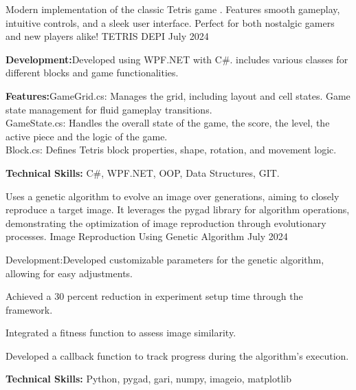 \begin{cventries}
  \cventry
    {Modern implementation of the classic Tetris game . Features smooth gameplay, intuitive controls, and a sleek user interface. Perfect for both nostalgic gamers and new players alike!
} %
    {TETRIS} %
    {DEPI} %
    {July 2024} %
    {
      \begin{cvitems} %
        \item \textbf{Development:}{Developed using WPF.NET with C#. includes various classes for different blocks and game functionalities.}
        \item \textbf{Features:}{GameGrid.cs: Manages the grid, including layout and cell states. Game state management for fluid gameplay transitions.\\ GameState.cs: Handles the overall state of the game, the score, the level, the active piece and the logic of the game.\\
        Block.cs: Defines Tetris block properties, shape, rotation, and movement logic.}
        \item \textbf{Technical Skills:}{ C\#, WPF.NET, OOP, Data Structures, GIT.}
      \end{cvitems}
    }
\end{cventries}  


\begin{cventries}
  \cventry
    {Uses a genetic algorithm to evolve an image over generations, aiming to closely reproduce a target image. It leverages the pygad library for algorithm operations, demonstrating the optimization of image reproduction through evolutionary processes.
} %
    {Image Reproduction Using Genetic Algorithm
} %
    {} %
    {July 2024} %
    {
      \begin{cvitems} %
        \item {Development:Developed customizable parameters for the genetic algorithm, allowing for easy adjustments.}
        \item {Achieved a 30 percent reduction in experiment setup time through the framework.}
        \item {Integrated a fitness function to assess image similarity.
                }
        \item {Developed a callback function to track progress during the algorithm's execution.}
        \item \textbf{Technical Skills:}{ Python, pygad, gari, numpy, imageio, matplotlib}
      \end{cvitems}
    }
\end{cventries}  
